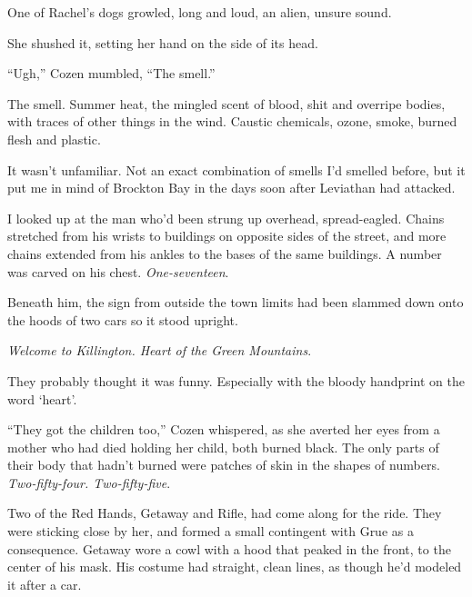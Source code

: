 





One of Rachel's dogs growled, long and loud, an alien, unsure sound.



She shushed it, setting her hand on the side of its head.



``Ugh,'' Cozen mumbled, ``The smell.''



The smell.  Summer heat, the mingled scent of blood, shit and overripe bodies, with traces of other things in the wind.  Caustic chemicals, ozone, smoke, burned flesh and plastic.



It wasn't unfamiliar.  Not an exact combination of smells I'd smelled before, but it put me in mind of Brockton Bay in the days soon after Leviathan had attacked.



I looked up at the man who'd been strung up overhead, spread-eagled.  Chains stretched from his wrists to buildings on opposite sides of the street, and more chains extended from his ankles to the bases of the same buildings.  A number was carved on his chest.  \emph{One-seventeen}.



Beneath him, the sign from outside the town limits had been slammed down onto the hoods of two cars so it stood upright.



\emph{Welcome to Killington.  Heart of the Green Mountains}.



They probably thought it was funny.  Especially with the bloody handprint on the word `heart'.



``They got the children too,'' Cozen whispered, as she averted her eyes from a mother who had died holding her child, both burned black.  The only parts of their body that hadn't burned were patches of skin in the shapes of numbers.  \emph{Two-fifty-four.  Two-fifty-five}.



Two of the Red Hands, Getaway and Rifle, had come along for the ride.  They were sticking close by her, and formed a small contingent with Grue as a consequence.  Getaway wore a cowl with a hood that peaked in the front, to the center of his mask.  His costume had straight, clean lines, as though he'd modeled it after a car.



